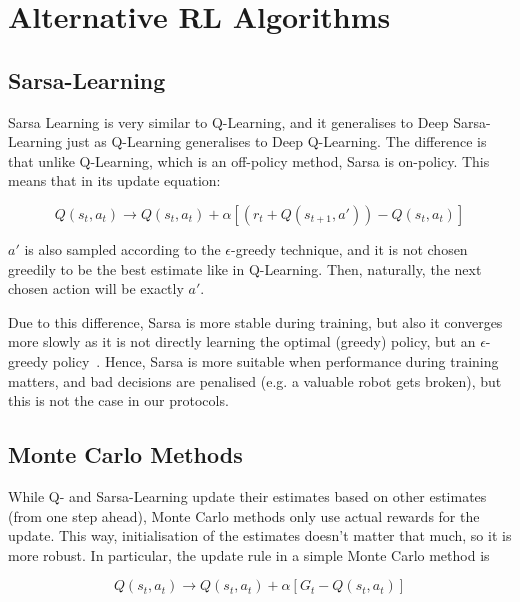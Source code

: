 \chapter{Alternative RL Algorithms}\label{alternativeRL} 



\section{Sarsa-Learning}

Sarsa Learning is very similar to Q-Learning, and it generalises to Deep Sarsa-Learning just as Q-Learning generalises to Deep Q-Learning. The difference is that unlike Q-Learning, which is an off-policy method, Sarsa is on-policy. This means that in its update equation:

\begin{equation} \label{eq:sarsa-learningUpdate}
Q(s_t,a_t) \longrightarrow Q(s_t,a_t) + \alpha[( r_t + Q(s_{t+1}, a')) - Q(s_t,a_t)]
\end{equation}

$a'$ is also sampled according to the $\epsilon$-greedy technique, and it is not chosen greedily to be the best estimate like in Q-Learning. Then, naturally, the next chosen action will be exactly $a'$.

Due to this difference, Sarsa is more stable during training, but also it converges more slowly as it is not directly learning the optimal (greedy) policy, but an $\epsilon$-greedy policy~\cite{sutton2018RLbook}. Hence, Sarsa is more suitable when performance during training matters, and bad decisions are penalised (e.g. a valuable robot gets broken), but this is not the case in our protocols.

\section{Monte Carlo Methods}


While Q- and Sarsa-Learning update their estimates based on other estimates (from one step ahead), Monte Carlo methods only use actual rewards for the update. This way, initialisation of the estimates doesn't matter that much, so it is more robust. In particular, the update rule in a simple Monte Carlo method is

\begin{equation} \label{eq:monte-carloUpdate}
Q(s_t,a_t) \longrightarrow Q(s_t,a_t) + \alpha[G_t - Q(s_t,a_t)]
\end{equation}

